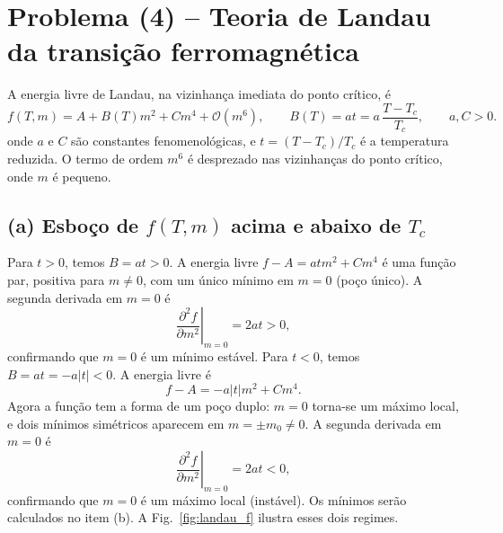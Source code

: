 \documentclass[11pt,a4paper]{article}
\begin{document}
\section*{Problema (4) -- Teoria de Landau da transição ferromagnética}
%
A energia livre de Landau, na vizinhança imediata do ponto crítico, é
%
\begin{equation}
    f(T,m)=A+B(T)m^2+Cm^4+\mathcal O(m^6),
    \qquad
    B(T)=at=a\,\frac{T-T_c}{T_c},
    \qquad a,C>0.
    \label{eq:landau_f}
\end{equation}
%
onde $a$ e $C$ são constantes fenomenológicas, e $t = (T - T_c)/T_c$ é a temperatura reduzida. O termo de ordem $m^6$ é desprezado nas vizinhanças do ponto crítico, onde $m$ é pequeno.
%
\subsection*{(a) Esboço de $f(T,m)$ acima e abaixo de $T_c$}
%
Para $t > 0$, temos $B = a t > 0$. A energia livre $f-A=atm^2+Cm^4$ é uma função par, positiva para $m\neq0$, com um único mínimo em $m=0$ (poço único). A segunda derivada em $m = 0$ é
%
\begin{equation}
    \left. \frac{\partial^2 f}{\partial m^2} \right|_{m=0} = 2a t > 0,
\end{equation}
%
confirmando que $m = 0$ é um mínimo estável. Para $t < 0$, temos $B = a t = -a |t| < 0$. A energia livre é
%
\begin{equation}
    f - A = -a |t| m^2 + C m^4.
\end{equation}
%
Agora a função tem a forma de um poço duplo: $m = 0$ torna-se um máximo local, e dois mínimos simétricos aparecem em $m = \pm m_0 \neq 0$. A segunda derivada em $m = 0$ é
%
\begin{equation}
    \left. \frac{\partial^2 f}{\partial m^2} \right|_{m=0} = 2a t < 0,
\end{equation}
%
confirmando que $m = 0$ é um máximo local (instável). Os mínimos serão calculados no item (b).
%
A Fig.~\ref{fig:landau_f} ilustra esses dois regimes.
%
\end{document}
